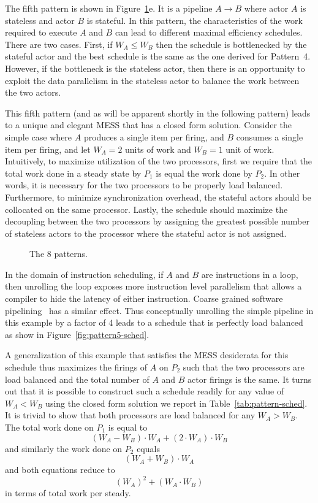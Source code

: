 The fifth pattern is shown in Figure~\ref{fig:patterns}e. It is a
pipeline $A\rightarrow B$ where actor $A$ is stateless and actor $B$
is stateful. In this pattern, the characteristics of the work required
to execute $A$ and $B$ can lead to different maximal efficiency
schedules.  There are two cases. First, if $W_A \le W_B$ then the
schedule is bottlenecked by the stateful actor and the best schedule
is the same as the one derived for Pattern~4. However, if the
bottleneck is the stateless actor, then there is an opportunity to
exploit the data parallelism in the stateless actor to balance the
work between the two actors.

This fifth pattern (and as will be apparent shortly in the following
pattern) leads to a unique and elegant MESS that has a closed form
solution. Consider the simple case where $A$ produces a single item
per firing, and $B$ consumes a single item per firing, and let $W_A =
2$ units of work and $W_B = 1$ unit of work. Intuitively, to maximize
utilization of the two processors, first we require that the total
work done in a steady state by $P_1$ is equal the work done by
$P_2$. In other words, it is necessary for the two processors to be
properly load balanced. Furthermore, to minimize synchronization
overhead, the stateful actors should be collocated on the same
processor. Lastly, the schedule should maximize the decoupling between
the two processors by assigning the greatest possible number of
stateless actors to the processor where the stateful actor is not
assigned.

\begin{figure}[t]
\begin{center}
\caption{{\small The 8 patterns.
\protect\label{fig:patterns}}}
\end{center}
\end{figure}

In the domain of instruction scheduling, if $A$ and $B$ are
instructions in a loop, then unrolling the loop exposes more
instruction level parallelism that allows a compiler to hide the
latency of either instruction. Coarse grained software
pipelining~\cite{mgordon-aplos06} has a similar effect. Thus
conceptually unrolling the simple pipeline in this example by a factor
of 4 leads to a schedule that is perfectly load balanced as show in
Figure~\ref{fig:pattern5-sched}. 

A generalization of this example that satisfies the MESS desiderata
for this schedule thus maximizes the firings of $A$ on $P_2$ such that
the two processors are load balanced and the total number of $A$ and
$B$ actor firings is the same. It turns out that it is possible to
construct such a schedule readily for any value of $W_A < W_B$ using
the closed form solution we report in
Table~\ref{tab:pattern-sched}. It is trivial to show that both
processors are load balanced for any $W_A > W_B$. The total work done
on $P_1$ is equal to
\[
(W_A - W_B) \cdot W_A + (2 \cdot W_A) \cdot W_B
\]
and similarly the work done on $P_2$ equals
\[
(W_A + W_B) \cdot W_A
\]
and both equations reduce to 
\[
(W_A)^2 + (W_A \cdot W_B)
\]
in terms of total work per steady.


